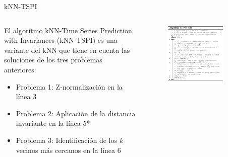 \documentclass[12pt, aspectratio=169]{beamer} %
\begin{document}
\begin{frame}{kNN-TSPI}
  \begin{columns}
    \begin{column}{0.5\textwidth}
      El algoritmo kNN-Time Series Prediction with Invariances (kNN-TSPI) es una variante del kNN que tiene en cuenta las soluciones de los tres problemas anteriores:
      \begin{itemize}
      \item Problema 1: Z-normalización en la línea 3
      \item Problema 2: Aplicación de la distancia invariante en la línea 5*
      \item Problema 3: Identificación de los \textit{k} vecinos más cercanos en la línea 6
      \end{itemize}
      
    \end{column}
    \begin{column}{0.5\textwidth}
        \begin{figure}
          \includegraphics[width=0.8\textwidth]{20210313_2_algoritmo.png}
          \label{fig:algoritmo}
        \end{figure}

    \end{column}                
  \end{columns}

  
\end{frame}
\end{document}
